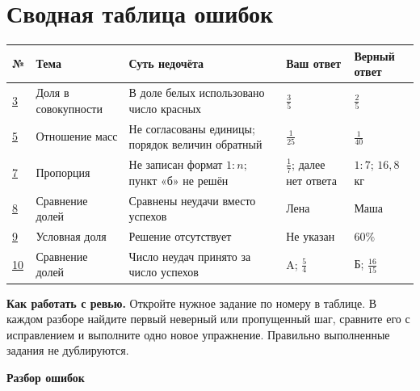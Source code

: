 \documentclass[a4paper,11pt]{article}
\begin{document}
\section*{Сводная таблица ошибок}
\vspace{2mm}
\small
\renewcommand{\arraystretch}{1.36}
\begin{tabularx}{\linewidth}{@{}p{9mm}p{28mm}X p{27mm}p{27mm}@{}}
\toprule
№ & Тема & Суть недочёта & Ваш ответ & Верный ответ \\
\midrule
\hyperref[task:3]{3} & Доля в совокупности & В доле белых использовано число красных & $\frac35$ & $\frac25$ \\
\hyperref[task:5]{5} & Отношение масс & Не согласованы единицы; порядок величин обратный & $\frac1{25}$ & $\frac1{40}$ \\
\hyperref[task:7]{7} & Пропорция & Не записан формат $1:n$; пункт «б» не решён & $\frac17$; далее нет ответа & $1:7$; $16{,}8$ кг \\
\hyperref[task:8]{8} & Сравнение долей & Сравнены неудачи вместо успехов & Лена & Маша \\
\hyperref[task:9]{9} & Условная доля & Решение отсутствует & Не указан & $60\%$ \\
\hyperref[task:10]{10} & Сравнение долей & Число неудач принято за число успехов & A; $\frac54$ & Б; $\frac{16}{15}$ \\
\bottomrule
\end{tabularx}
\normalsize
\par\vspace{8mm}
\noindent\textbf{Как работать с ревью.} Откройте нужное задание по номеру в таблице. В каждом разборе найдите первый неверный или пропущенный шаг, сравните его с исправлением и выполните одно новое упражнение. Правильно выполненные задания не дублируются.
\clearpage
\thispagestyle{empty}
\vspace*{0.34\textheight}
\begin{center}
{\LARGE\bfseries\color{deepaccent}Разбор ошибок}
\end{center}
\end{document}
